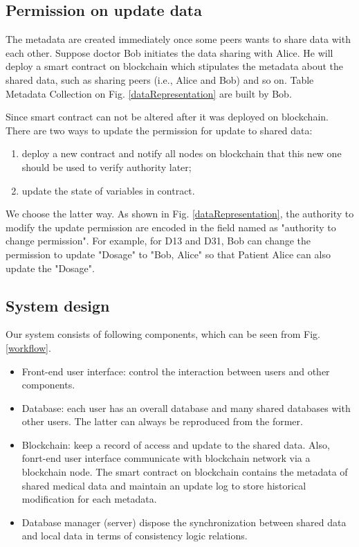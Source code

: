 \documentclass[conference]{IEEEtran}
\begin{document}
\subsection{Permission on update data}
The metadata are created immediately once some peers wants to share data with each other. Suppose doctor Bob initiates the data sharing with Alice. He will deploy a smart contract on blockchain which stipulates the metadata about the shared data, such as sharing peers (i.e., Alice and Bob) and so on.  Table Metadata Collection on Fig. \ref{dataRepresentation} are built by Bob. 

Since smart contract can not be altered after it was deployed on blockchain. There are two ways to update the permission for update to shared data:
\begin{enumerate}
	\item deploy a new contract and notify all nodes on blockchain that this new one should be used to verify authority later;
	\item update the state of variables in contract.
\end{enumerate}
We choose the latter way. As shown in Fig. \ref{dataRepresentation}, the authority to modify the update permission are encoded in the field named as "authority to change permission". For example, for D13 and D31, Bob can change the permission to update "Dosage" to "Bob, Alice" so that Patient Alice can also update the  "Dosage".

\subsection{System design}
Our system consists of following components, which can be seen from Fig. \ref{workflow}.
\begin{itemize}
	\item Front-end user interface: control the interaction between users and other components.
	\item Database: each user has an overall database and many shared databases with other users. The latter can always be reproduced from the former.
	\item Blockchain: keep a record of access and update to the shared data. Also, fonrt-end user interface communicate with blockchain network via a blockchain node. The smart contract on blockchain contains the metadata of shared medical data and maintain an update log to store historical modification for each metadata.
	\item Database manager (server) dispose the synchronization between shared data and local data in terms of consistency logic relations.

\end{itemize}
\end{document}
